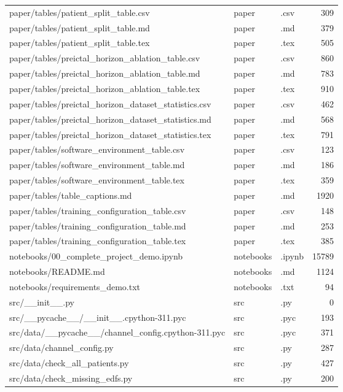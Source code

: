 \begin{tabular}{lllr}
paper/tables/patient\_split\_table.csv & paper & .csv & 309 \\
paper/tables/patient\_split\_table.md & paper & .md & 379 \\
paper/tables/patient\_split\_table.tex & paper & .tex & 505 \\
paper/tables/preictal\_horizon\_ablation\_table.csv & paper & .csv & 860 \\
paper/tables/preictal\_horizon\_ablation\_table.md & paper & .md & 783 \\
paper/tables/preictal\_horizon\_ablation\_table.tex & paper & .tex & 910 \\
paper/tables/preictal\_horizon\_dataset\_statistics.csv & paper & .csv & 462 \\
paper/tables/preictal\_horizon\_dataset\_statistics.md & paper & .md & 568 \\
paper/tables/preictal\_horizon\_dataset\_statistics.tex & paper & .tex & 791 \\
paper/tables/software\_environment\_table.csv & paper & .csv & 123 \\
paper/tables/software\_environment\_table.md & paper & .md & 186 \\
paper/tables/software\_environment\_table.tex & paper & .tex & 359 \\
paper/tables/table\_captions.md & paper & .md & 1920 \\
paper/tables/training\_configuration\_table.csv & paper & .csv & 148 \\
paper/tables/training\_configuration\_table.md & paper & .md & 253 \\
paper/tables/training\_configuration\_table.tex & paper & .tex & 385 \\
notebooks/00\_complete\_project\_demo.ipynb & notebooks & .ipynb & 15789 \\
notebooks/README.md & notebooks & .md & 1124 \\
notebooks/requirements\_demo.txt & notebooks & .txt & 94 \\
src/\_\_init\_\_.py & src & .py & 0 \\
src/\_\_pycache\_\_/\_\_init\_\_.cpython-311.pyc & src & .pyc & 193 \\
src/data/\_\_pycache\_\_/channel\_config.cpython-311.pyc & src & .pyc & 371 \\
src/data/channel\_config.py & src & .py & 287 \\
src/data/check\_all\_patients.py & src & .py & 427 \\
src/data/check\_missing\_edfs.py & src & .py & 200 \\

\end{tabular}
